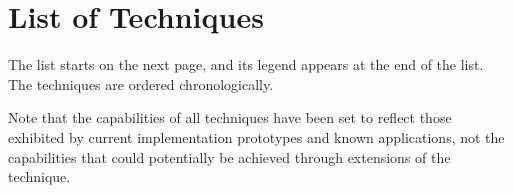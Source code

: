 %

\chapter{List of Techniques}

The list starts on the next page, and its legend appears at the end of the list.
The techniques are ordered chronologically.

Note that the capabilities of all techniques have been set to reflect those
exhibited by current implementation prototypes and known applications, not the
capabilities that could potentially be achieved through extensions of the
technique.

\begingroup
\small

\def\abbvPrinciple{PR}
\def\abbvScope{SC}
\def\abbvOptimal{OP}
\def\abbvMultiOutOp{MO}
\def\abbvDisjointOutOp{DO}
\def\abbvIntBlockOp{IB}
\def\abbvIntDepOp{IN}

\def\pME{ME}
\def\pMEPlusAppend{$^{+}$}
\def\pMEPlusInText{\pME\pMEPlusAppend}
\def\pMEPlus{%
  \pME\rlap{\pMEPlusAppend}%
}
\def\pTC{TC}
\def\pDC{DC}
\def\pTD{TD}
\def\pGC{GC}
\def\pMS{MS}
\def\notSupported{%
  \tikz{%
    \node [not supported] {};
  }%
}
\def\partSupported{%
  \tikz{%
    \node [not supported] (c) {};
    \draw [draw=none, fill=black]
          (c.south) arc (270:90:\pgfkeysvalueof{/tikz/circle radius})
          --
          cycle;
  }%
}
\def\fullySupported{%
  \tikz{%
    \node [fully supported] {};
  }%
}
\newcommand{\shrinkSupportCircle}[1]{%
  \maxsizebox{6pt}{6pt}{#1}%
}
\def\notSupportedSmall{%
  \shrinkSupportCircle{\notSupported}%
}
\def\partSupportedSmall{%
  \shrinkSupportCircle{\partSupported}%
}
\def\fullySupportedSmall{%
  \shrinkSupportCircle{\fullySupported}%
}
\def\localScope{L}
\def\globalScope{G}

\let\oldtabhead\tabhead
\renewcommand{\tabhead}[1]{%
  {\oldtabhead\relsize{.5}\textsc{\MakeLowercase{#1}}}%
}

